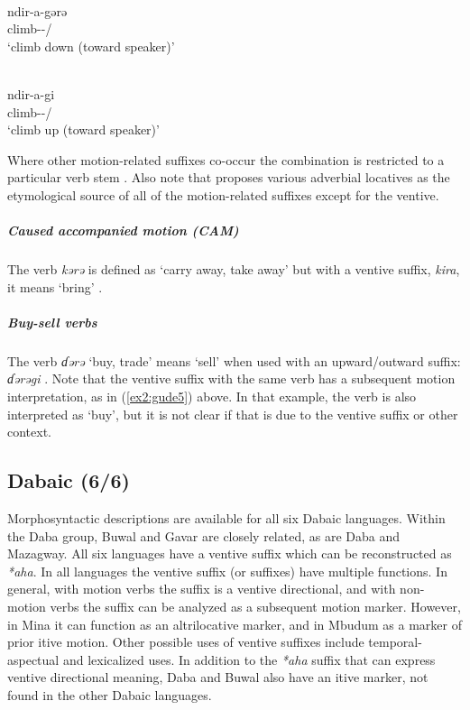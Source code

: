 \ea\label{ex2:gude16}
 \\
\gll ndir-a-gərə	\\
climb--/	\\
\glt `climb down (toward speaker)'

\ex\label{ex2:gude17}
 \\
\gll ndir-a-gi \\
climb--/	\\
\glt `climb up (toward speaker)'

\z 

Where other motion-related suffixes co-occur the combination is restricted to a particular verb stem \citep[364]{schuhChadicCornucopia2017}.  Also note that \citet[359--360]{schuhChadicCornucopia2017} proposes various adverbial locatives as the etymological source of all of the motion-related suffixes except for the ventive.

\subparagraph{Caused accompanied motion (CAM)}

The verb \textit{kərə} is defined as `carry away, take away' but with a ventive suffix, \textit{kira}, it means `bring' \citep[209]{hoskinsonGrammarDictionaryGude1983}.

\subparagraph{Buy-sell verbs}

The verb \textit{ɗərə} `buy, trade' means `sell' when used with an upward/outward suffix: \textit{ɗərəgi} \citep[182]{hoskinsonGrammarDictionaryGude1983}. Note that the ventive suffix with the same verb has a subsequent motion interpretation, as in (\ref{ex2:gude5}) above. In that example, the verb is also interpreted as `buy', but it is not clear if that is due to the ventive suffix or other context.

\subsection{Dabaic (6/6)}

Morphosyntactic descriptions are available for all six Dabaic languages. Within the Daba group, Buwal and Gavar are closely related, as are Daba and Mazagway. All six languages have a ventive suffix which can be reconstructed as \textit{*aha}. In all languages the ventive suffix (or suffixes) have multiple functions. In general, with motion verbs the suffix is a ventive directional, and with non-motion verbs the suffix can be analyzed as a subsequent motion marker. However, in Mina it can function as an altrilocative marker, and in Mbudum as a marker of prior itive motion. Other possible uses of ventive suffixes include temporal-aspectual and lexicalized uses. In addition to the \textit{*aha} suffix that can express ventive directional meaning, Daba and Buwal also have an itive marker, not found in the other Dabaic languages.

